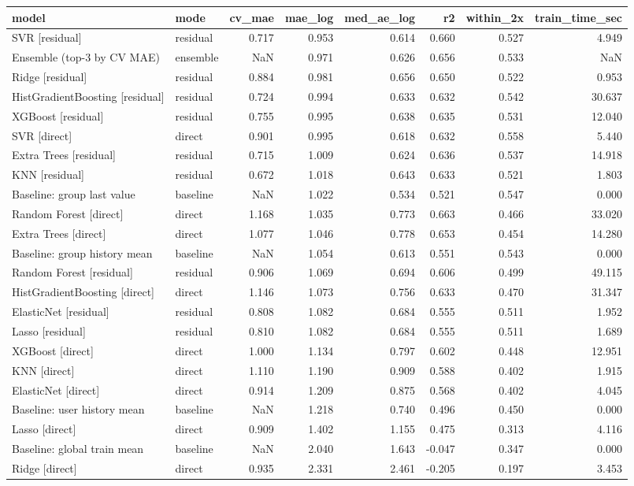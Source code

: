 \begin{tabular}{llrrrrrr}
\toprule
model & mode & cv_mae & mae_log & med_ae_log & r2 & within_2x & train_time_sec \\
\midrule
SVR [residual] & residual & 0.717 & 0.953 & 0.614 & 0.660 & 0.527 & 4.949 \\
Ensemble (top-3 by CV MAE) & ensemble & NaN & 0.971 & 0.626 & 0.656 & 0.533 & NaN \\
Ridge [residual] & residual & 0.884 & 0.981 & 0.656 & 0.650 & 0.522 & 0.953 \\
HistGradientBoosting [residual] & residual & 0.724 & 0.994 & 0.633 & 0.632 & 0.542 & 30.637 \\
XGBoost [residual] & residual & 0.755 & 0.995 & 0.638 & 0.635 & 0.531 & 12.040 \\
SVR [direct] & direct & 0.901 & 0.995 & 0.618 & 0.632 & 0.558 & 5.440 \\
Extra Trees [residual] & residual & 0.715 & 1.009 & 0.624 & 0.636 & 0.537 & 14.918 \\
KNN [residual] & residual & 0.672 & 1.018 & 0.643 & 0.633 & 0.521 & 1.803 \\
Baseline: group last value & baseline & NaN & 1.022 & 0.534 & 0.521 & 0.547 & 0.000 \\
Random Forest [direct] & direct & 1.168 & 1.035 & 0.773 & 0.663 & 0.466 & 33.020 \\
Extra Trees [direct] & direct & 1.077 & 1.046 & 0.778 & 0.653 & 0.454 & 14.280 \\
Baseline: group history mean & baseline & NaN & 1.054 & 0.613 & 0.551 & 0.543 & 0.000 \\
Random Forest [residual] & residual & 0.906 & 1.069 & 0.694 & 0.606 & 0.499 & 49.115 \\
HistGradientBoosting [direct] & direct & 1.146 & 1.073 & 0.756 & 0.633 & 0.470 & 31.347 \\
ElasticNet [residual] & residual & 0.808 & 1.082 & 0.684 & 0.555 & 0.511 & 1.952 \\
Lasso [residual] & residual & 0.810 & 1.082 & 0.684 & 0.555 & 0.511 & 1.689 \\
XGBoost [direct] & direct & 1.000 & 1.134 & 0.797 & 0.602 & 0.448 & 12.951 \\
KNN [direct] & direct & 1.110 & 1.190 & 0.909 & 0.588 & 0.402 & 1.915 \\
ElasticNet [direct] & direct & 0.914 & 1.209 & 0.875 & 0.568 & 0.402 & 4.045 \\
Baseline: user history mean & baseline & NaN & 1.218 & 0.740 & 0.496 & 0.450 & 0.000 \\
Lasso [direct] & direct & 0.909 & 1.402 & 1.155 & 0.475 & 0.313 & 4.116 \\
Baseline: global train mean & baseline & NaN & 2.040 & 1.643 & -0.047 & 0.347 & 0.000 \\
Ridge [direct] & direct & 0.935 & 2.331 & 2.461 & -0.205 & 0.197 & 3.453 \\
\bottomrule
\end{tabular}
